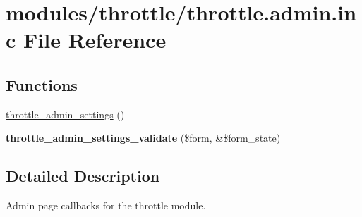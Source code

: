 \hypertarget{throttle_8admin_8inc}{
\section{modules/throttle/throttle.admin.inc File Reference}
\label{throttle_8admin_8inc}
}
\subsection*{Functions}
\begin{CompactItemize}
\item 
\hyperlink{group__forms_g0eb8c200e818d57f21108249cd048621}{throttle\_\-admin\_\-settings} ()
\item 
\hypertarget{throttle_8admin_8inc_4948d49f320a850fb176b5c7a1c07475}{
\textbf{throttle\_\-admin\_\-settings\_\-validate} (\$form, \&\$form\_\-state)}
\label{throttle_8admin_8inc_4948d49f320a850fb176b5c7a1c07475}

\end{CompactItemize}


\subsection{Detailed Description}
Admin page callbacks for the throttle module. 